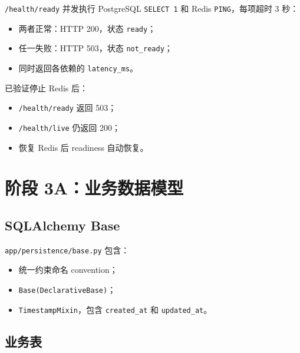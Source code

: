 \documentclass[11pt,a4paper]{ctexart}
\begin{document}
\texttt{/health/ready} 并发执行 PostgreSQL \texttt{SELECT 1} 和 Redis
\texttt{PING}，每项超时 3 秒：

\begin{itemize}[leftmargin=2em]
  \item 两者正常：HTTP 200，状态 \texttt{ready}；
  \item 任一失败：HTTP 503，状态 \texttt{not\_ready}；
  \item 同时返回各依赖的 \texttt{latency\_ms}。
\end{itemize}

已验证停止 Redis 后：

\begin{itemize}[leftmargin=2em]
  \item \texttt{/health/ready} 返回 503；
  \item \texttt{/health/live} 仍返回 200；
  \item 恢复 Redis 后 readiness 自动恢复。
\end{itemize}

\section{阶段 3A：业务数据模型}

\subsection{SQLAlchemy Base}

\texttt{app/persistence/base.py} 包含：

\begin{itemize}[leftmargin=2em]
  \item 统一约束命名 convention；
  \item \texttt{Base(DeclarativeBase)}；
  \item \texttt{TimestampMixin}，包含
        \texttt{created\_at} 和 \texttt{updated\_at}。
\end{itemize}

\subsection{业务表}
\end{document}
